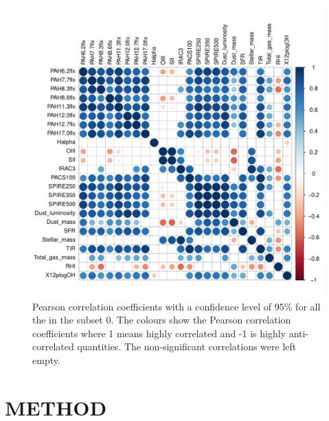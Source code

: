      
      \begin{figure}
                \centering
                \includegraphics[width=\textwidth]{../image_paper3/images0.01/cor_plots/M31_all_derived_ones_core_plot_for_paper.pdf}
            \caption{Pearson correlation coefficients with a confidence level of 95$\%$ for all the in the subset 0. The colours show the Pearson correlation coefficients where 1 means highly correlated and -1 is highly anti-correlated quantities. The non-significant correlations were left empty.}
            \label{fig: cor_all}
        \end{figure}
 
  

\section{METHOD}
\label{sec: method}
